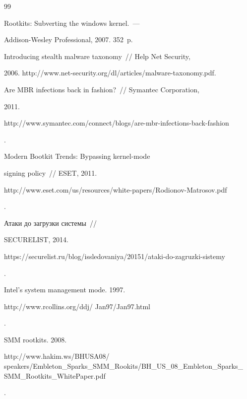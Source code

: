 {\small\frenchspacing


{%




\begin{thebibliography}{99}










   Rootkits: Subverting the windows kernel.~--- 


Addison-Wesley Professional, 2007. 352~p. 




   Introducing stealth malware taxonomy~/\!\!/ Help Net Security, 


2006. {\sf http://www.net-security.org/dl/articles/malware-taxonomy.pdf}.




 Are MBR infections back in fashion?~/\!\!/ Symantec Corporation, 


2011. {\sf 


http://www.symantec.com/connect/blogs/are-mbr-infections-back-fashion}.




   Modern Bootkit Trends: Bypassing kernel-mode 


signing policy~/\!\!/ ESET, 2011. {\sf 


  http://www.eset.com/us/resources/white-papers/Rodionov-Matrosov.pdf}.




   Атаки до загрузки системы~/\!\!/ 


SECURELIST, 2014. {\sf 


  https://securelist.ru/blog/issledovaniya/20151/ataki-do-zagruzki-sistemy}.




   Intel's system management mode. 1997. {\sf 


http://www.rcollins.org/ddj/ Jan97/Jan97.html}.




   SMM rootkits. 2008. {\sf 


http://www.hakim.ws/BHUSA08/ speakers/Embleton\_Sparks\_SMM\_Rookits/BH\_US\_08\_Embleton\_Sparks\_ SMM\_Rootkits\_WhitePaper.pdf}.



\end{thebibliography}}}
